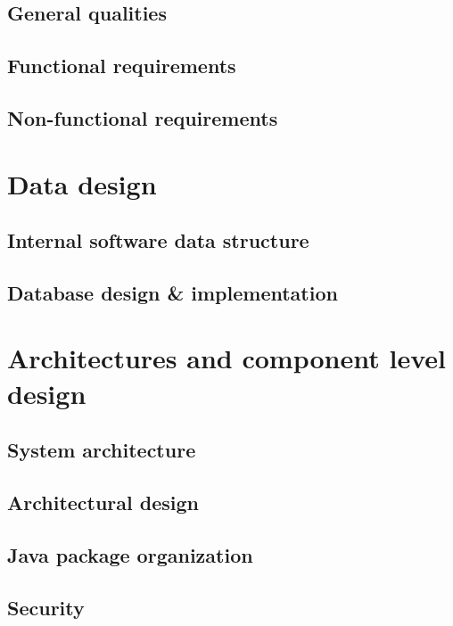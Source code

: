 \documentclass[a4paper]{scrreprt}
\begin{document}
\section{General qualities}

\section{Functional requirements}

\section{Non-functional requirements}

\chapter{Data design}

\section{Internal software data structure}

\section{Database design \& implementation}

\chapter{Architectures and component level design}

\section{System architecture}

\section{Architectural design}

\section{Java package organization}

\section{Security}
\end{document}
